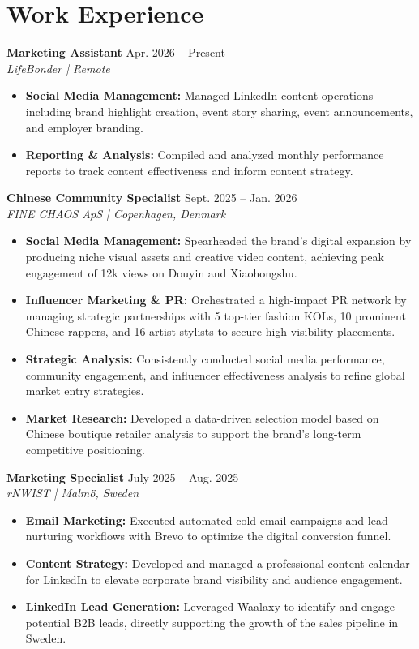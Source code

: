 \documentclass[a4paper,10pt]{article}
\begin{document}
\section*{Work Experience}

\textbf{Marketing Assistant} \hfill Apr. 2026 -- Present\\
\textit{LifeBonder | Remote}
\begin{itemize}[noitemsep]
  \item \textbf{Social Media Management:} Managed LinkedIn content operations including brand highlight creation,  event story sharing, event announcements, and employer branding.
  \item \textbf{Reporting \& Analysis:} Compiled and analyzed monthly performance reports to track content effectiveness and inform content strategy.
\end{itemize}

\vspace{6pt}
\textbf{Chinese Community Specialist} \hfill Sept. 2025 -- Jan. 2026\\
\textit{FINE CHAOS ApS | Copenhagen, Denmark}
\begin{itemize}[noitemsep]
  \item \textbf{Social Media Management:} Spearheaded the brand's digital expansion by producing niche visual assets and creative video content, achieving peak engagement of 12k views on Douyin and Xiaohongshu.
  \item \textbf{Influencer Marketing \& PR:} Orchestrated a high-impact PR network by managing strategic partnerships with 5 top-tier fashion KOLs, 10 prominent Chinese rappers, and 16 artist stylists to secure high-visibility placements.
  \item \textbf{Strategic Analysis:} Consistently conducted social media performance, community engagement, and influencer effectiveness analysis to refine global market entry strategies.
  \item \textbf{Market Research:} Developed a data-driven selection model based on Chinese boutique retailer analysis to support the brand's long-term competitive positioning.
\end{itemize}

\vspace{6pt}
\textbf{Marketing Specialist} \hfill July 2025 -- Aug. 2025\\
\textit{rNWIST | Malm\"{o}, Sweden}
\begin{itemize}[noitemsep]
  \item \textbf{Email Marketing:} Executed automated cold email campaigns and lead nurturing workflows with Brevo to optimize the digital conversion funnel.
  \item \textbf{Content Strategy:} Developed and managed a professional content calendar for LinkedIn to elevate corporate brand visibility and audience engagement.
  \item \textbf{LinkedIn Lead Generation:} Leveraged Waalaxy to identify and engage potential B2B leads, directly supporting the growth of the sales pipeline in Sweden.
\end{itemize}
\end{document}
